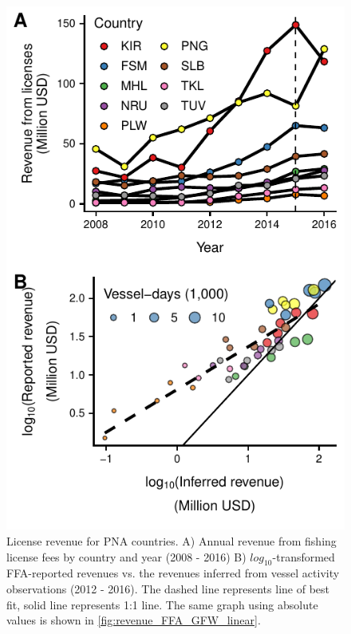 \documentclass[12pt]{article}
\begin{document}
\begin{figure}[htbp]
\centering
\includegraphics{img/revenues.pdf}
\caption{\label{fig:revenues}
License revenue for PNA countries. A) Annual revenue from fishing license fees by country and year (2008 - 2016) B) $log_{10}$-transformed FFA-reported revenues vs. the revenues inferred from vessel activity observations (2012 - 2016). The dashed line represents line of best fit, solid line represents 1:1 line. The same graph using absolute values is shown in \ref{fig:revenue_FFA_GFW_linear}.}
\end{figure}


\end{document}
